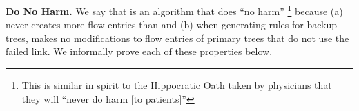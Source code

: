 



{\bf Do No Harm.} 
We say that \merge is an algorithm that does ``no harm''  \footnote{This is similar in spirit to the Hippocratic Oath taken by physicians that they will ``never do harm [to patients]'' }
because (a) \merge never creates more flow entries than \base and (b) when generating rules for backup trees, \merge makes no modifications to flow entries of primary trees that do not use the 
failed link. We informally prove each of these properties below.

